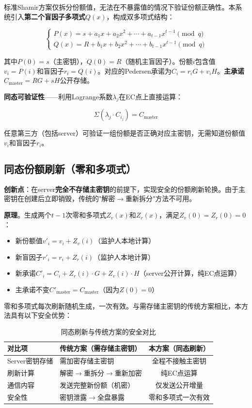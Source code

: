 \documentclass[UTF8,a4paper,zihao=-4,openany]{ctexrep}
\begin{document}
标准Shamir方案仅拆分份额值，无法在不暴露值的情况下验证份额正确性。本系统引入\textbf{第二个盲因子多项式}$Q(x)$，构成双多项式结构：

\[
\begin{cases}
P(x) = s + a_1x + a_2x^2 + \cdots + a_{t-1}x^{t-1} \pmod{q} \\
Q(x) = R + b_1x + b_2x^2 + \cdots + b_{t-1}x^{t-1} \pmod{q}
\end{cases}
\]

其中$P(0) = s$（主密钥），$Q(0) = R$（随机主盲因子）。份额$i$包含值$v_i = P(i)$和盲因子$r_i = Q(i)$。对应的Pedersen承诺为$C_i = r_iG + v_iH$。\textbf{主承诺}$C_{\text{master}} = RG + sH$公开存储。

\noindent \textbf{同态可验证性}——利用Lagrange系数$\lambda_j$在EC点上直接运算：

\[
\Sigma(\lambda_j \cdot C_{i_j}) = C_{\text{master}}
\]

任意第三方（包括server）可验证一组份额是否正确对应主密钥，无需知道份额值$v_i$和盲因子$r_i$。

\subsection{同态份额刷新（零和多项式）}

\textbf{创新点}：在server\textbf{完全不存储主密钥}的前提下，实现安全的份额刷新轮换。由于主密钥在创建后立即销毁，传统的"解密$\to$重新拆分"方法不可用。

\noindent \textbf{原理}。生成两个$t-1$次零和多项式$Z_v(x)$和$Z_r(x)$，满足$Z_v(0) = Z_r(0) = 0$：

\begin{itemize}
  \item 新份额值$v'_i = v_i + Z_v(i)$（监护人本地计算）
  \item 新盲因子$r'_i = r_i + Z_r(i)$（监护人本地计算）
  \item 新承诺$C'_i = C_i + Z_r(i)\cdot G + Z_v(i)\cdot H$（server公开计算，纯EC点运算）
  \item 主承诺不变$C'_{\text{master}} = C_{\text{master}}$（因为$Z(0) = 0$）
\end{itemize}

零和多项式每次刷新随机生成，一次有效。与需存储主密钥的传统方案相比，本方法具有以下安全优势：

\begin{table}[htbp]
\centering
\caption{同态刷新与传统方案的安全对比}
\begin{tabularx}{\textwidth}{lXc}
\toprule
对比项 & 传统方案（需存储主密钥） & 本方案（同态刷新）\\
\midrule
Server密钥存储 & 需加密存储主密钥 & 全程不接触主密钥\\
刷新计算 & 解密$\to$重拆分$\to$重新加密 & 纯EC点运算\\
通信内容 & 发送完整新份额（机密） & 仅发送公开增量\\
安全性 & 密钥泄露$\to$全盘暴露 & 零和多项式一次有效\\
\bottomrule
\end{tabularx}
\end{table}
\end{document}
